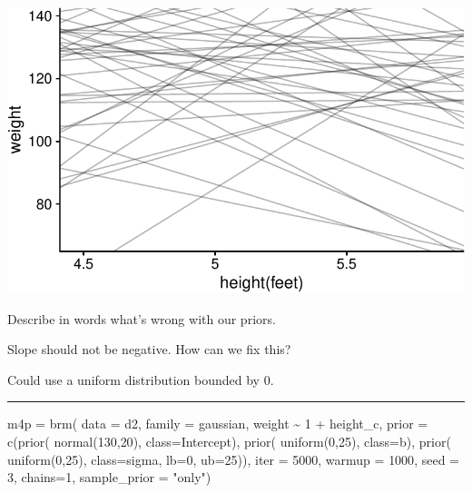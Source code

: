\documentclass[
  letterpaper,
  DIV=11,
  numbers=noendperiod]{scrartcl}
\newenvironment{Shaded}{\begin{snugshade}}{\end{snugshade}}
\newcommand{\AttributeTok}[1]{\textcolor[rgb]{0.40,0.45,0.13}{#1}}
\newcommand{\DecValTok}[1]{\textcolor[rgb]{0.68,0.00,0.00}{#1}}
\newcommand{\FunctionTok}[1]{\textcolor[rgb]{0.28,0.35,0.67}{#1}}
\newcommand{\NormalTok}[1]{\textcolor[rgb]{0.00,0.23,0.31}{#1}}
\newcommand{\OtherTok}[1]{\textcolor[rgb]{0.00,0.23,0.31}{#1}}
\newcommand{\SpecialCharTok}[1]{\textcolor[rgb]{0.37,0.37,0.37}{#1}}
\newcommand{\StringTok}[1]{\textcolor[rgb]{0.13,0.47,0.30}{#1}}
\begin{document}
\includegraphics[width=17.1875in,height=\textheight]{lecture02-1_files/figure-pdf/unnamed-chunk-28-1.pdf}

Describe in words what's wrong with our priors.

Slope should not be negative. How can we fix this?

Could use a uniform distribution bounded by 0.

\begin{center}\rule{0.5\linewidth}{0.5pt}\end{center}

\begin{Shaded}
\begin{Highlighting}[]
\NormalTok{m4p }\OtherTok{=} \FunctionTok{brm}\NormalTok{(}
  \AttributeTok{data =}\NormalTok{ d2,}
  \AttributeTok{family =}\NormalTok{ gaussian,}
\NormalTok{  weight }\SpecialCharTok{\textasciitilde{}} \DecValTok{1} \SpecialCharTok{+}\NormalTok{ height\_c,}
  \AttributeTok{prior =} \FunctionTok{c}\NormalTok{(}\FunctionTok{prior}\NormalTok{( }\FunctionTok{normal}\NormalTok{(}\DecValTok{130}\NormalTok{,}\DecValTok{20}\NormalTok{), }\AttributeTok{class=}\NormalTok{Intercept),}
            \FunctionTok{prior}\NormalTok{( }\FunctionTok{uniform}\NormalTok{(}\DecValTok{0}\NormalTok{,}\DecValTok{25}\NormalTok{),   }\AttributeTok{class=}\NormalTok{b),}
            \FunctionTok{prior}\NormalTok{( }\FunctionTok{uniform}\NormalTok{(}\DecValTok{0}\NormalTok{,}\DecValTok{25}\NormalTok{),  }\AttributeTok{class=}\NormalTok{sigma, }\AttributeTok{lb=}\DecValTok{0}\NormalTok{, }\AttributeTok{ub=}\DecValTok{25}\NormalTok{)),  }
      \AttributeTok{iter =} \DecValTok{5000}\NormalTok{, }\AttributeTok{warmup =} \DecValTok{1000}\NormalTok{, }\AttributeTok{seed =} \DecValTok{3}\NormalTok{, }\AttributeTok{chains=}\DecValTok{1}\NormalTok{,}
  \AttributeTok{sample\_prior =} \StringTok{"only"}\NormalTok{)}
\end{Highlighting}
\end{Shaded}
\end{document}
